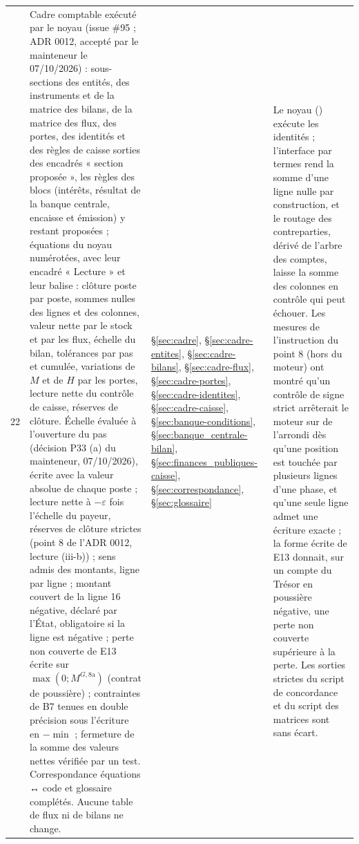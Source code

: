 \documentclass[11pt,a4paper]{article}
\newcommand{\code}[1]{\texttt{\detokenize{#1}}}
\begin{document}
\begin{center}
\begin{longtable}{p{0.5cm}>{\raggedright\arraybackslash}p{6.3cm}>{\raggedright\arraybackslash}p{2.1cm}>{\raggedright\arraybackslash}p{5.8cm}}
22 & Cadre comptable exécuté par le noyau (issue \#95 ; ADR 0012, accepté par le mainteneur le 07/10/2026) : sous-sections des entités, des instruments et de la matrice des bilans, de la matrice des flux, des portes, des identités et des règles de caisse sorties des encadrés « section proposée », les règles des blocs (intérêts, résultat de la banque centrale, encaisse et émission) y restant proposées ; équations du noyau numérotées, avec leur encadré « Lecture » et leur balise : clôture poste par poste, sommes nulles des lignes et des colonnes, valeur nette par le stock et par les flux, échelle du bilan, tolérances par pas et cumulée, variations de $M$ et de $H$ par les portes, lecture nette du contrôle de caisse, réserves de clôture. Échelle évaluée à l'ouverture du pas (décision P33 (a) du mainteneur, 07/10/2026), écrite avec la valeur absolue de chaque poste ; lecture nette à $-\varepsilon$ fois l'échelle du payeur, réserves de clôture strictes (point 8 de l'ADR 0012, lecture (iii-b)) ; sens admis des montants, ligne par ligne ; montant couvert de la ligne 16 négative, déclaré par l'État, obligatoire si la ligne est négative ; perte non couverte de E13 écrite sur $\max(0 ; M^{G,8\mathrm{a}})$ (contrat de poussière) ; contraintes de B7 tenues en double précision sous l'écriture en $-\min$ ; fermeture de la somme des valeurs nettes vérifiée par un test. Correspondance équations ↔ code et glossaire complétés. Aucune table de flux ni de bilans ne change. & \S\ref{sec:cadre}, \S\ref{sec:cadre-entites}, \S\ref{sec:cadre-bilans}, \S\ref{sec:cadre-flux}, \S\ref{sec:cadre-portes}, \S\ref{sec:cadre-identites}, \S\ref{sec:cadre-caisse}, \S\ref{sec:banque-conditions}, \S\ref{sec:banque_centrale-bilan}, \S\ref{sec:finances_publiques-caisse}, \S\ref{sec:correspondance}, \S\ref{sec:glossaire} & Le noyau (\code{nations.noyau}) exécute les identités ; l'interface par termes rend la somme d'une ligne nulle par construction, et le routage des contreparties, dérivé de l'arbre des comptes, laisse la somme des colonnes en contrôle qui peut échouer. Les mesures de l'instruction du point 8 (hors du moteur) ont montré qu'un contrôle de signe strict arrêterait le moteur sur de l'arrondi dès qu'une position est touchée par plusieurs lignes d'une phase, et qu'une seule ligne admet une écriture exacte ; la forme écrite de E13 donnait, sur un compte du Trésor en poussière négative, une perte non couverte supérieure à la perte. Les sorties strictes du script de concordance et du script des matrices sont sans écart.\\

\end{longtable}
\end{center}
\end{document}
